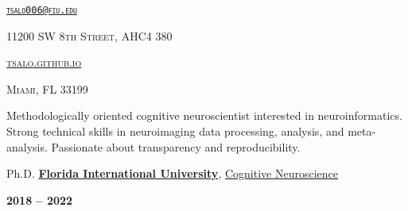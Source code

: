 \documentclass[10pt]{article}
\date{}
\newcommand{\namestyle}{\Huge \fontfamily{lmr}\selectfont}
\newcommand{\iconstyle}{\LARGE}
\newcommand{\headstyle}{\scshape \normalsize \textcolor{light-gray}}
\newcommand{\sectionstyle}{\LARGE \fontfamily{lmr}\selectfont}
\begin{document}
\begin{center}
	\namestyle{TAYLOR SALO}

	\bigskip

	\iconstyle{\href{https://github.com/tsalo}{\faGithubSquare}}
	\enspace
	\iconstyle{\href{https://orcid.org/0000-0001-9813-3167}{}}
	\enspace
	\iconstyle{\href{https://scholar.google.com/citations?user=YbH1akIAAAAJ}{}}
	\enspace
	\iconstyle{\href{https://osf.io/iwpvm/}{}}
\end{center}

\begin{minipage}[t]{.5\linewidth}
\flushleft
\headstyle{\href{mailto:tsalo006@fiu.edu}{\nolinkurl{tsalo006@fiu.edu}}}
\end{minipage}
\hfill
\begin{minipage}[t]{.5\linewidth}
\flushright
\headstyle{11200 SW 8th Street, AHC4 380}
\end{minipage}

\begin{minipage}[t]{.3\linewidth}
\flushleft
\headstyle{\href{https://tsalo.github.io}{tsalo.github.io}}
\end{minipage}
\hfill
\begin{minipage}[t]{.7\linewidth}
\flushright
\headstyle{Miami, FL 33199}
\end{minipage}


\bigskip

\begin{center}\sectionstyle{PROFILE}\end{center}

Methodologically oriented cognitive neuroscientist interested in neuroinformatics.
Strong technical skills in neuroimaging data processing, analysis, and meta-analysis.
Passionate about transparency and reproducibility.

\bigskip

\begin{center}\sectionstyle{EDUCATION}\end{center}

\begin{minipage}[t]{.7\linewidth}
	\flushleft
	\noindent
	Ph.D.
	\href{https://fiu.edu}{\textbf{Florida International University}},
	\href{https://case.fiu.edu/psychology/phd-in-cognitive-neuroscience/}{Cognitive Neuroscience}
	\end{minipage}
	\hfill
	\begin{minipage}[t]{.3\linewidth}
	\flushright
	\noindent
	\textsc{\textbf{2018 -- 2022}}
\end{minipage}
\end{document}

